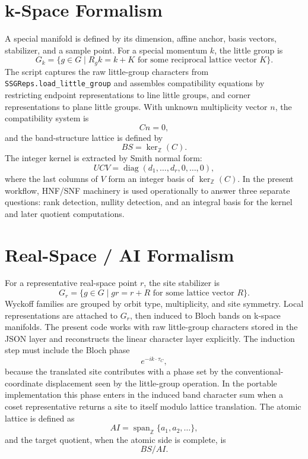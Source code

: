 \documentclass[11pt]{article}
\begin{document}
\section{k-Space Formalism}
A special manifold is defined by its dimension, affine anchor, basis vectors, stabilizer, and a sample point. For a special momentum $k$, the little group is
\[
G_k = \{ g \in G \mid R_g k = k + K \text{ for some reciprocal lattice vector } K \}.
\]
The script captures the raw little-group characters from \texttt{SSGReps.load\_little\_group} and assembles compatibility equations by restricting endpoint representations to line little groups, and corner representations to plane little groups. With unknown multiplicity vector $n$, the compatibility system is
\[
C n = 0,
\]
and the band-structure lattice is defined by
\[
BS = \ker_{\mathbb Z}(C).
\]
The integer kernel is extracted by Smith normal form:
\[
U C V = \operatorname{diag}(d_1,\dots,d_r,0,\dots,0),
\]
where the last columns of $V$ form an integer basis of $\ker_{\mathbb Z}(C)$. In the present workflow, HNF/SNF machinery is used operationally to answer three separate questions: rank detection, nullity detection, and an integral basis for the kernel and later quotient computations.

\section{Real-Space / AI Formalism}
For a representative real-space point $r$, the site stabilizer is
\[
G_r = \{ g \in G \mid g r = r + R \text{ for some lattice vector } R \}.
\]
Wyckoff families are grouped by orbit type, multiplicity, and site symmetry. Local representations are attached to $G_r$, then induced to Bloch bands on k-space manifolds. The present code works with raw little-group characters stored in the JSON layer and reconstructs the linear character layer explicitly. The induction step must include the Bloch phase
\[
e^{- i k \cdot \tau_C},
\]
because the translated site contributes with a phase set by the conventional-coordinate displacement seen by the little-group operation. In the portable implementation this phase enters in the induced band character sum when a coset representative returns a site to itself modulo lattice translation. The atomic lattice is defined as
\[
AI = \operatorname{span}_{\mathbb Z} \{ a_1,a_2,\dots \},
\]
and the target quotient, when the atomic side is complete, is
\[
BS/AI.
\]
\end{document}
